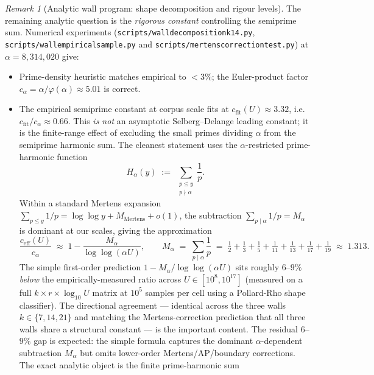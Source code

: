 \documentclass[11pt]{article}
\renewcommand{\_}{\origunderscore\allowbreak}
\theoremstyle{definition}
\theoremstyle{remark}
\newtheorem{remark}[theorem]{Remark}
\begin{document}
\begin{remark}[Analytic wall program: shape decomposition and rigour levels]
The remaining analytic question is the \emph{rigorous constant}
controlling the semiprime sum.  Numerical experiments
(\texttt{scripts/wall\_decomposition\_k14.py},
\texttt{scripts/wall\_empirical\_sample.py} and
\texttt{scripts/mertens\_correction\_test.py}) at
$\alpha=8{,}314{,}020$ give:
\begin{itemize}
  \item Prime-density heuristic matches empirical to $<3\%$; the
        Euler-product factor $c_{\alpha}=\alpha/\varphi(\alpha)\approx 5.01$
        is correct.
  \item The empirical semiprime constant at corpus scale fits at
        $c_{\mathrm{fit}}(U)\approx 3.32$, i.e.\
        $c_{\mathrm{fit}}/c_{\alpha}\approx 0.66$.  This \emph{is not}
        an asymptotic Selberg--Delange leading constant; it is the
        finite-range effect of excluding the small primes dividing
        $\alpha$ from the semiprime harmonic sum.  The cleanest
        statement uses the $\alpha$-restricted prime-harmonic
        function
        \[
          H_{\alpha}(y)\;:=\;\sum_{\substack{p\le y\\p\nmid\alpha}}\frac{1}{p}.
        \]
        Within a standard Mertens expansion
        $\sum_{p\le y}1/p=\log\log y+M_{\mathrm{Mertens}}+o(1)$, the
        subtraction $\sum_{p\mid\alpha}1/p=M_{\alpha}$ is dominant at
        our scales, giving the approximation
        \[
          \frac{c_{\mathrm{eff}}(U)}{c_{\alpha}}
          \;\approx\;
          1-\frac{M_{\alpha}}{\log\log(\alpha U)},
          \qquad
          M_{\alpha}\;=\;\sum_{p\mid\alpha}\frac{1}{p}
          \;=\;\tfrac12+\tfrac13+\tfrac15+\tfrac1{11}+\tfrac1{13}+\tfrac1{17}+\tfrac1{19}
          \;\approx\;1.313.
        \]
        The simple first-order prediction
        $1-M_{\alpha}/\log\log(\alpha U)$ sits roughly $6$--$9\%$
        \emph{below} the empirically-measured ratio across
        $U\in[10^{8},10^{17}]$ (measured on a full
        $k\times r\times\log_{10}U$ matrix at $10^{5}$ samples per
        cell using a Pollard-Rho shape classifier).  The directional
        agreement --- identical across the three walls
        $k\in\{7,14,21\}$ and matching the Mertens-correction
        prediction that all three walls share a structural
        constant --- is the important content.  The residual
        $6$--$9\%$ gap is expected: the simple formula captures the
        dominant $\alpha$-dependent subtraction $M_{\alpha}$ but
        omits lower-order Mertens/AP/boundary corrections.  The
        exact analytic object is the finite prime-harmonic sum

\end{itemize}
\end{remark}
\end{document}
